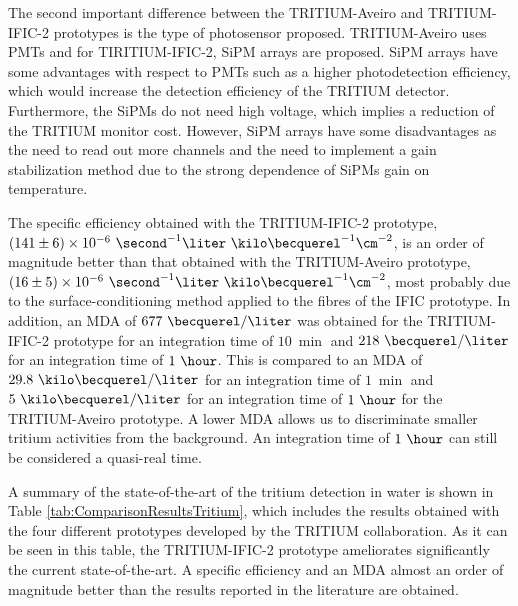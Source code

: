 \begin{enumerate}
The second important difference between the TRITIUM-Aveiro and TRITIUM-IFIC-2 prototypes is the type of photosensor proposed. TRITIUM-Aveiro uses PMTs and for TIRITIUM-IFIC-2, SiPM arrays are proposed. SiPM arrays have some advantages with respect to PMTs such as a higher photodetection efficiency, which would increase the detection efficiency of the TRITIUM detector. Furthermore, the SiPMs do not need high voltage, which implies a reduction of the TRITIUM monitor cost. However, SiPM arrays have some disadvantages as the need to read out more channels and the need to implement a gain stabilization method due to the strong dependence of SiPMs gain on temperature.

The specific efficiency obtained with the TRITIUM-IFIC-2 prototype, $(141 \pm 6) \times 10^{-6}~ \second^{-1}  \liter ~ \kilo\becquerel^{-1} \cm^{-2}$, is an order of magnitude better than that obtained with the TRITIUM-Aveiro prototype, $(16 \pm 5)\times 10^{-6}~ \second^{-1}  \liter ~ \kilo\becquerel^{-1} \cm^{-2}$, most probably due to the surface-conditioning method applied to the fibres of the IFIC prototype. In addition, an MDA of $677~\becquerel/\liter$ was obtained for the TRITIUM-IFIC-2 prototype for an integration time of $10~\min$ and $218~\becquerel/\liter$ for an integration time of $1~\hour$. This is compared to an MDA of $29.8~\kilo\becquerel/\liter$ for an integration time of $1~\min$ and $5~\kilo\becquerel/\liter$ for an integration time of $1~\hour$ for the TRITIUM-Aveiro prototype. A lower MDA allows us to discriminate smaller tritium activities from the background. An integration time of $1~\hour$ can still be considered a quasi-real time.

A summary of the state-of-the-art of the tritium detection in water is shown in Table \ref{tab:ComparisonResultsTritium}, which includes the results obtained with the four different prototypes developed by the TRITIUM collaboration. As it can be seen in this table, the TRITIUM-IFIC-2 prototype ameliorates significantly the current state-of-the-art. A specific efficiency and an MDA almost an order of magnitude better than the results reported in the literature are obtained.


\end{enumerate}
